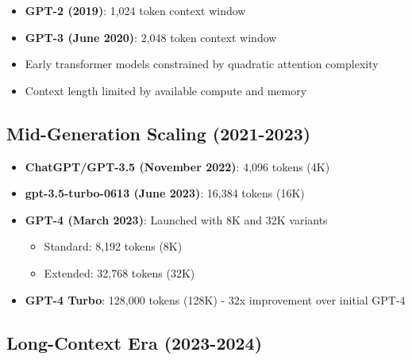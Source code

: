 \documentclass[11pt,letterpaper]{article}
\begin{document}
\begin{itemize}[leftmargin=*]
    \item \textbf{GPT-2 (2019)}: 1,024 token context window
    \item \textbf{GPT-3 (June 2020)}: 2,048 token context window
    \item Early transformer models constrained by quadratic attention complexity
    \item Context length limited by available compute and memory
\end{itemize}

\subsection{Mid-Generation Scaling (2021-2023)}

\begin{itemize}[leftmargin=*]
    \item \textbf{ChatGPT/GPT-3.5 (November 2022)}: 4,096 tokens (4K)
    \item \textbf{gpt-3.5-turbo-0613 (June 2023)}: 16,384 tokens (16K)
    \item \textbf{GPT-4 (March 2023)}: Launched with 8K and 32K variants
    \begin{itemize}
        \item Standard: 8,192 tokens (8K)
        \item Extended: 32,768 tokens (32K)
    \end{itemize}
    \item \textbf{GPT-4 Turbo}: 128,000 tokens (128K) - 32x improvement over initial GPT-4
\end{itemize}

\subsection{Long-Context Era (2023-2024)}
\end{document}
